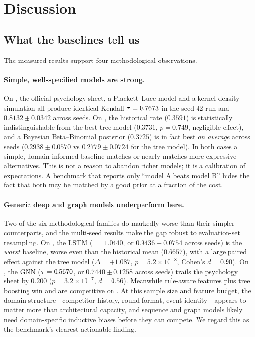 \section{Discussion}
\label{sec:discussion}

\subsection{What the baselines tell us}
\label{sec:disc-insights}

The measured results support four methodological observations.

\paragraph{Simple, well-specified models are strong.} On , the official
psychology sheet, a Plackett--Luce model and a kernel-density simulation all
produce identical Kendall $\tau=0.7673$ in the seed-42 run and
$0.8132\pm0.0342$ across seeds. On , the historical \DNF{} rate
($0.3591$) is statistically indistinguishable from the best tree model
($0.3731$, $p=0.749$, negligible effect), and a Bayesian Beta--Binomial
posterior ($0.3725$) is in fact best \emph{on average} across seeds
($0.2938\pm0.0570$ vs $0.2779\pm0.0724$ for the tree model). In both cases a
simple, domain-informed baseline matches or nearly matches more expressive
alternatives. This is not a reason to abandon richer models; it is a calibration
of expectations. A benchmark that reports only ``model A beats model B'' hides
the fact that both may be matched by a good prior at a fraction of the cost.

\paragraph{Generic deep and graph models underperform here.} Two of the six
methodological families do markedly worse than their simpler counterparts, and
the multi-seed results make the gap robust to evaluation-set resampling. On
, the LSTM (\maelog{} $=1.0440$, or $0.9436\pm0.0754$ across seeds) is
the \emph{worst} baseline, worse even than the historical mean
($0.6657$), with a large paired effect against the tree model
($\Delta=+1.087$, $p=5.2\times10^{-8}$, Cohen's $d=0.90$). On , the GNN
($\tau=0.5670$, or $0.7440\pm0.1258$ across seeds) trails the psychology
sheet by $0.200$ ($p=3.2\times10^{-7}$, $d=0.56$). Meanwhile rule-aware
features plus tree boosting win  and are competitive on . At
this sample size and feature budget, the domain structure---competitor history,
round format, event identity---appears to matter more than architectural
capacity, and sequence and graph models likely need domain-specific inductive
biases before they can compete. We regard this as the benchmark's clearest
actionable finding.

